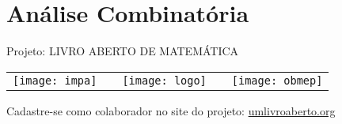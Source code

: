 \chapter{Análise Combinatória}
\label{combinatoria-chap}

\mbox{}\thispagestyle{empty}\clearpage

\thispagestyle{empty}

\begin{center}
Projeto: LIVRO ABERTO DE MATEMÁTICA

\noindent \begin{tabular}{lcccr}
\texttt{[image: impa]}& \quad\quad& \texttt{[image: logo]} & \quad\quad& \texttt{[image: obmep]} 
\end{tabular}
\end{center}

\vspace*{.3cm}

Cadastre-se como colaborador no site do projeto: \url{umlivroaberto.org}




